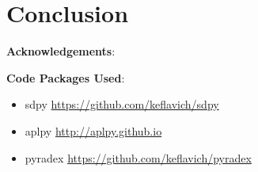 %
%
%

\section{Conclusion}


\textbf{Acknowledgements}:

\textbf{Code Packages Used}:

\begin{itemize}
    \item sdpy \url{https://github.com/keflavich/sdpy}
    \item aplpy \url{http://aplpy.github.io}
    \item pyradex \url{https://github.com/keflavich/pyradex}
\end{itemize}





